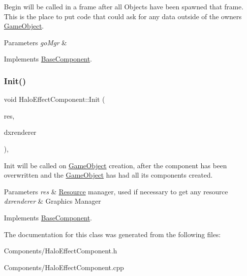 Begin will be called in a frame after all Objects have been spawned that frame. This is the place to put code that could ask for any data outside of the owner\textquotesingle{}s \hyperlink{classGameObject}{Game\+Object}. 


\begin{DoxyParams}{Parameters}
{\em go\+Mgr} & \\
\hline
\end{DoxyParams}


Implements \hyperlink{classBaseComponent}{Base\+Component}.

\mbox{\label{classHaloEffectComponent_aa5ebc7c6bf980154f6ee203694ebb824}} 
\subsubsection{\texorpdfstring{Init()}{Init()}}
{\footnotesize\ttfamily void Halo\+Effect\+Component\+::\+Init (\begin{DoxyParamCaption}\item[{\hyperlink{classResourceManager}{Resource\+Manager} $\ast$}]{res,  }\item[{\hyperlink{classDXRenderer}{D\+X\+Renderer} $\ast$}]{dxrenderer }\end{DoxyParamCaption})\hspace{0.3cm}{\ttfamily [override]}, {\ttfamily [virtual]}}



Init will be called on \hyperlink{classGameObject}{Game\+Object} creation, after the component has been overwritten and the \hyperlink{classGameObject}{Game\+Object} has had all its components created. 


\begin{DoxyParams}{Parameters}
{\em res} & \hyperlink{structResource}{Resource} manager, used if necessary to get any resource \\
\hline
{\em dxrenderer} & Graphic\textquotesingle{}s Manager \\
\hline
\end{DoxyParams}


Implements \hyperlink{classBaseComponent}{Base\+Component}.



The documentation for this class was generated from the following files\+:\begin{DoxyCompactItemize}
\item 
Components/Halo\+Effect\+Component.\+h\item 
Components/Halo\+Effect\+Component.\+cpp\end{DoxyCompactItemize}
